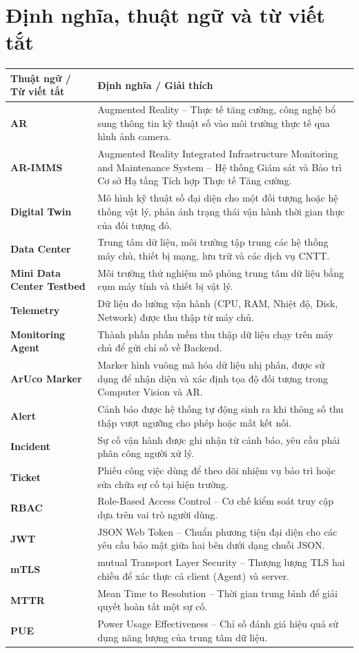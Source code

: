 \section{Định nghĩa, thuật ngữ và từ viết tắt}
\begin{longtable}{|p{3cm}|p{11.5cm}|}
\hline
\textbf{Thuật ngữ / Từ viết tắt} & \textbf{Định nghĩa / Giải thích} \\ \hline
\endhead
\textbf{AR} & Augmented Reality – Thực tế tăng cường, công nghệ bổ sung thông tin kỹ thuật số vào môi trường thực tế qua hình ảnh camera. \\ \hline
\textbf{AR-IMMS} & Augmented Reality Integrated Infrastructure Monitoring and Maintenance System – Hệ thống Giám sát và Bảo trì Cơ sở Hạ tầng Tích hợp Thực tế Tăng cường. \\ \hline
\textbf{Digital Twin} & Mô hình kỹ thuật số đại diện cho một đối tượng hoặc hệ thống vật lý, phản ánh trạng thái vận hành thời gian thực của đối tượng đó. \\ \hline
\textbf{Data Center} & Trung tâm dữ liệu, môi trường tập trung các hệ thống máy chủ, thiết bị mạng, lưu trữ và các dịch vụ CNTT. \\ \hline
\textbf{Mini Data Center Testbed} & Môi trường thử nghiệm mô phỏng trung tâm dữ liệu bằng cụm máy tính và thiết bị vật lý. \\ \hline
\textbf{Telemetry} & Dữ liệu đo lường vận hành (CPU, RAM, Nhiệt độ, Disk, Network) được thu thập từ máy chủ. \\ \hline
\textbf{Monitoring Agent} & Thành phần phần mềm thu thập dữ liệu chạy trên máy chủ để gửi chỉ số về Backend. \\ \hline
\textbf{ArUco Marker} & Marker hình vuông mã hóa dữ liệu nhị phân, được sử dụng để nhận diện và xác định tọa độ đối tượng trong Computer Vision và AR. \\ \hline
\textbf{Alert} & Cảnh báo được hệ thống tự động sinh ra khi thông số thu thập vượt ngưỡng cho phép hoặc mất kết nối. \\ \hline
\textbf{Incident} & Sự cố vận hành được ghi nhận từ cảnh báo, yêu cầu phải phân công người xử lý. \\ \hline
\textbf{Ticket} & Phiếu công việc dùng để theo dõi nhiệm vụ bảo trì hoặc sửa chữa sự cố tại hiện trường. \\ \hline
\textbf{RBAC} & Role-Based Access Control – Cơ chế kiểm soát truy cập dựa trên vai trò người dùng. \\ \hline
\textbf{JWT} & JSON Web Token – Chuẩn phương tiện đại diện cho các yêu cầu bảo mật giữa hai bên dưới dạng chuỗi JSON. \\ \hline
\textbf{mTLS} & mutual Transport Layer Security – Thượng lượng TLS hai chiều để xác thực cả client (Agent) và server. \\ \hline
\textbf{MTTR} & Mean Time to Resolution – Thời gian trung bình để giải quyết hoàn tất một sự cố. \\ \hline
\textbf{PUE} & Power Usage Effectiveness – Chỉ số đánh giá hiệu quả sử dụng năng lượng của trung tâm dữ liệu. \\ \hline
\end{longtable}

